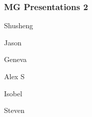 \documentclass[t,12pt,numbers,fleqn]{beamer}
\begin{document}



\begin{frame}
\frametitle{MG Presentations 2}

\bi
\item Shusheng
\item Jason
\item Geneva
\item Alex S
\item Isobel
\item Steven
\ei
\end{frame}

\end{document}
